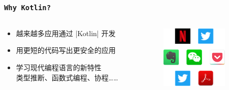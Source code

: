 \begin{frame}[fragile]
    \frametitle{\texttt{Why Kotlin?}}
    \begin{columns}
        \begin{column}{0.5\textwidth}
            \begin{itemize}
                \item 越来越多应用通过 |Kotlin| 开发
                \item 用更\textcolor{yzlblue}{短}的代码写出更\textcolor{yzlblue}{安全}的应用
                \item 学习现代编程语言的新特性\\类型推断、函数式编程、协程……
            \end{itemize}
        \end{column}
        \begin{column}{0.5\textwidth}
            \begin{figure}
            \begin{center}
                \includegraphics[height=3cm]{fig/apps.png}
            \end{center}
            \end{figure}
        \end{column}
    \end{columns}
\end{frame}
